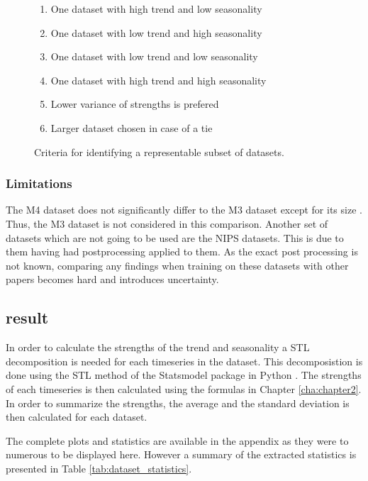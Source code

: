 \begin{figure}[h]
  \begin{enumerate}
    \item One dataset with high trend and low seasonality
    \item One dataset with low trend and high seasonality
    \item One dataset with low trend and low seasonality
    \item One dataset with high trend and high seasonality
    \item Lower variance of strengths is prefered
    \item Larger dataset chosen in case of a tie
  \end{enumerate}
  \caption{Criteria for identifying a representable subset of datasets.}
  \label{dataset_criteria}
\end{figure}


\subsubsection{Limitations}
The M4 dataset does not significantly differ to the M3 dataset except for its size \cite{m3_vs_M4}. Thus, the M3 dataset is not considered in this comparison. Another set of datasets which are not going to be used are the NIPS datasets. This is due to them having had postprocessing applied to them. As the exact post processing is not known, comparing any findings when training on these datasets with other papers becomes hard and introduces uncertainty.

\subsection{result}
In order to calculate the strengths of the trend and   seasonality a STL decomposition is needed for each timeseries in the dataset. This decomposistion is done using the STL method of the Statsmodel package in Python \cite{seabold2010statsmodels}. The strengths of each timeseries is then calculated using the formulas in Chapter \ref{cha:chapter2}. In order to summarize the strengths, the average and the standard deviation is then calculated for each dataset.

The complete plots and statistics are available in the appendix as they were to numerous to be displayed here. However a summary of the extracted statistics is presented in Table \ref{tab:dataset_statistics}.


